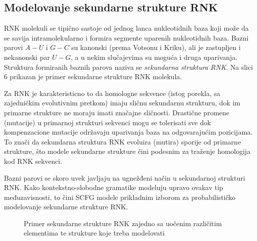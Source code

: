 \documentclass[a4paper, 12pt]{article}
\begin{document}
\subsection{Modelovanje sekundarne strukture RNK}

RNK molekuli se tipično sastoje od jednog lanca nukleotidnih baza koji može da se savija intramolekularno i formira segmente uparenih nukleotidnih baza. Bazni parovi $A-U$ i $G-C$ su kanonski (prema Votsonu i Kriku), ali je zastupljen i nekanonski par $U-G$, a u nekim slučajevima su moguća i druga uparivanja. Struktura formiranih baznih parova naziva se \textit{sekundarna struktura RNK}. Na slici 6 prikazan je primer sekundarne strukture RNK molekula.

Za RNK je karakteristicno to da homologne sekvence (istog porekla, sa zajedničkim evolutivnim pretkom) imaju sličnu sekundarnu strukturu, dok im primarne strukture ne moraju imati značajne sličnosti. Drastične promene (mutacije) u primarnoj strukturi sekvenci mogu se tolerisati sve dok kompenzacione mutacije održavaju uparivanja baza na odgovarajućim pozicijama. To znači da sekundarna struktura RNK evoluira (mutira) sporije od primarne strukture, što modele sekundarne strukture čini podesnim za traženje homologija kod RNK sekvenci.

Bazni parovi se skoro uvek javljaju na ugnežđeni način u sekundarnoj strukturi RNK. Kako kontekstno-slobodne gramatike modeluju upravo ovakav tip međuzavisnosti, to čini SCFG modele prikladnim izborom za probabilističko modelovanje sekundarne strukture RNK.

\begin{figure}[h!]
    \centering
    \captionsetup{width=0.7\linewidth}
    \vspace{-0.15cm}
    \vspace{0.1cm}
    \caption{Primer sekundarne strukture RNK zajedno sa uočenim različitim elementima te strukture koje treba modelovati}
\end{figure}
\end{document}
